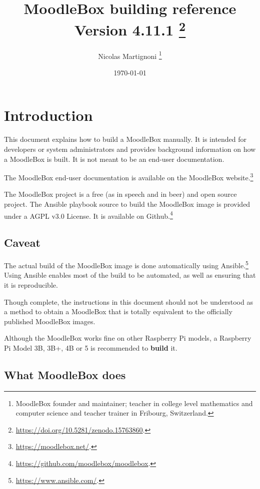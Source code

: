\documentclass[12pt]{article}
\begin{document}
\title{MoodleBox building reference\\Version 4.11.1%
  \footnote{\url{https://doi.org/10.5281/zenodo.15763860}.}%
}
\date{\today} %
\author{Nicolas Martignoni%
  \footnote{MoodleBox founder and maintainer; teacher in college level mathematics and computer science and teacher trainer in Fribourg, Switzerland.}%
}
\maketitle

\begingroup
\setlength{\parskip}{3pt plus1pt minus1pt}
\tableofcontents
\endgroup
\clearpage

\section{Introduction}

This document explains how to build a MoodleBox manually.
It is intended for developers or system administrators and provides background information on how a MoodleBox is built.
It is not meant to be an end-user documentation.

The MoodleBox end-user documentation is available on the MoodleBox website.\footnote{\url{https://moodlebox.net/}.}

The MoodleBox project is a free (as in speech and in beer) and open source project. The Ansible playbook source to build the MoodleBox image is provided under a AGPL v3.0 License. It is available on Github.\footnote{\url{https://github.com/moodlebox/moodlebox}.}

\subsection{Caveat}

The actual build of the MoodleBox image is done automatically using Ansible.\footnote{\url{https://www.ansible.com/}.}
Using Ansible enables most of the build to be automated, as well as ensuring that it is reproducible.

Though complete, the instructions in this document should not be understood as a method to obtain a MoodleBox that is totally equivalent to the officially published MoodleBox images.

Although the MoodleBox works fine on other Raspberry Pi models, a Raspberry Pi Model 3B, 3B+, 4B or 5 is recommended to \textbf{build} it.

\subsection{What MoodleBox does}
\end{document}
